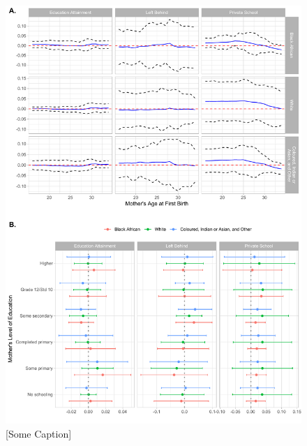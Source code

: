 \documentclass[11pt,a4paper]{article}
\begin{document}
\begin{figure}[h!]
\centering
\caption{\label{fig:05}[Some Caption]}
\includegraphics[width=\textwidth]{figures/heter1.pdf}
\end{figure}
\end{document}
